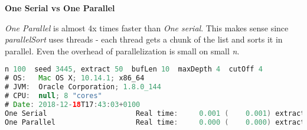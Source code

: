 \documentclass[format=acmsmall, review=false, screen=true]{acmart}
\begin{document}
\textbf{One Serial vs One Parallel}

\emph{One Parallel} is almost 4x times faster than \emph{One serial}. This makes sense since \emph{parallelSort} uses threads - each thread gets a chunk of the list and sorts it in parallel. Even the overhead of parallelization is small on small \emph{n}.

\begin{lstlisting}[language=java]
n 100  seed 3445, extract 50  bufLen 10  maxDepth 4  cutOff 4
# OS:   Mac OS X; 10.14.1; x86_64
# JVM:  Oracle Corporation; 1.8.0_144
# CPU:  null; 8 "cores"
# Date: 2018-12-18T17:43:03+0100
One Serial                     Real time:     0.001 (    0.001) extract:    50
One Parallel                   Real time:     0.000 (    0.000) extract:    50
\end{lstlisting}
\end{document}
